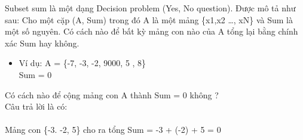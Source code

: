 \documentclass{article}
\begin{document}
    Subset sum là một dạng Decision problem (Yes, No question). Được mô tả như sau: Cho một cặp (A, Sum) trong đó A là một mảng \{x1,x2 …,  xN\} và Sum là một số nguyên. Có cách nào để bất kỳ mảng con nào của A tổng lại bằng chính xác Sum hay không.
    
    
    \begin{itemize}
        \item Ví dụ: A = \{-7, -3, -2, 9000, 5 , 8\}\\   \hspace*{1.3cm} Sum = 0
    \end{itemize}
    Có cách nào để cộng mảng con A thành Sum = 0 không ?\\
    Câu trả lời là có:\\\\
    Mảng con \{-3. -2,  5\} cho ra tổng Sum = -3 + (-2) + 5  = 0
\end{document}
